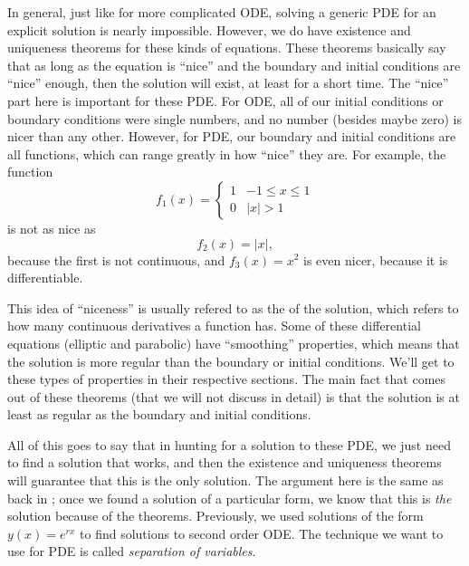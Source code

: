 In general, just like for more complicated ODE, solving a generic PDE for an explicit solution is nearly impossible. However, we do have existence and uniqueness theorems for these kinds of equations. These theorems basically say that as long as the equation is ``nice'' and the boundary and initial conditions are ``nice'' enough, then the solution will exist, at least for a short time. The ``nice'' part here is important for these PDE. For ODE, all of our initial conditions or boundary conditions were single numbers, and no number (besides maybe zero) is nicer than any other. However, for PDE, our boundary and initial conditions are all functions, which can range greatly in how ``nice'' they are. For example, the function
\[ f_1(x) = \begin{cases} 1 & -1 \leq x \leq 1 \\ 0 & |x| > 1 \end{cases} \] is not as nice as
\[ f_2(x) = |x|, \] because the first is not continuous, and $f_3(x) = x^2$ is even nicer, because it is differentiable. 

This idea of ``niceness'' is usually refered to as the \emph{} of the solution, which refers to how many continuous derivatives a function has. Some of these differential equations (elliptic and parabolic) have ``smoothing'' properties, which means that the solution is more regular than the boundary or initial conditions. We'll get to these types of properties in their respective sections. The main fact that comes out of these theorems (that we will not discuss in detail) is that the solution is at least as regular as the boundary and initial conditions.

All of this goes to say that in hunting for a solution to these PDE, we just need to find a solution that works, and then the existence and uniqueness theorems will guarantee that this is the only solution. The argument here is the same as back in ; once we found a solution of a particular form, we know that this is \emph{the} solution because of the theorems. Previously, we used solutions of the form $y(x) = e^{rx}$ to find solutions to second order ODE. The technique we want to use for PDE is called \emph{separation of variables}. 


